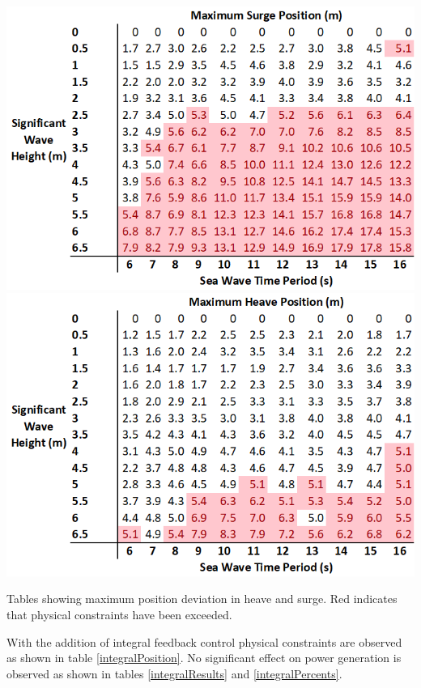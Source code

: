 \documentclass{report}
\begin{document}
\begin{table}
\centering
\includegraphics[scale=0.7]{tables/SaESurgePos}
\includegraphics[scale=0.7]{tables/SaEHeavePos}
\caption{Tables showing maximum position deviation in heave and surge. Red indicates that physical constraints have been exceeded.}
\label{SAEPosition}
\end{table}

\FloatBarrier

With the addition of integral feedback control physical constraints are observed as shown in table \ref{integralPosition}. No significant effect on power generation is observed as shown in tables \ref{integralResults} and \ref{integralPercents}.
\end{document}
